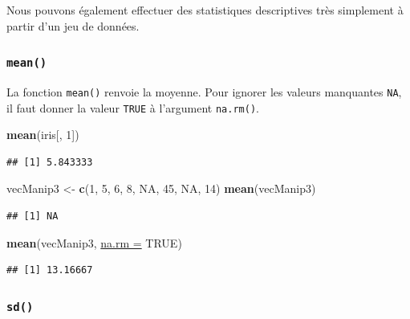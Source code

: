 \documentclass[twoside,symmetric]{book}
\newenvironment{Shaded}{}{}
\newcommand{\DataTypeTok}[1]{\underline{#1}}
\newcommand{\DecValTok}[1]{#1}
\newcommand{\KeywordTok}[1]{\textbf{#1}}
\newcommand{\NormalTok}[1]{#1}
\newcommand{\OtherTok}[1]{#1}
\newcommand{\StringTok}[1]{#1}
\begin{document}
Nous pouvons également effectuer des statistiques descriptives très simplement à partir d'un jeu de données.

\hypertarget{l015mean}{%
\subsubsection{\texorpdfstring{\texttt{mean()}}{mean()}}\label{l015mean}}

La fonction \texttt{mean()} renvoie la moyenne. Pour ignorer les valeurs manquantes \texttt{NA}, il faut donner la valeur \texttt{TRUE} à l'argument \texttt{na.rm()}.

\begin{Shaded}
\begin{Highlighting}[]
\KeywordTok{mean}\NormalTok{(iris[, }\DecValTok{1}\NormalTok{])}
\end{Highlighting}
\end{Shaded}

\begin{verbatim}
## [1] 5.843333
\end{verbatim}

\begin{Shaded}
\begin{Highlighting}[]
\NormalTok{vecManip3 <-}\StringTok{ }\KeywordTok{c}\NormalTok{(}\DecValTok{1}\NormalTok{, }\DecValTok{5}\NormalTok{, }\DecValTok{6}\NormalTok{, }\DecValTok{8}\NormalTok{, }\OtherTok{NA}\NormalTok{, }\DecValTok{45}\NormalTok{, }\OtherTok{NA}\NormalTok{, }\DecValTok{14}\NormalTok{)}
\KeywordTok{mean}\NormalTok{(vecManip3)}
\end{Highlighting}
\end{Shaded}

\begin{verbatim}
## [1] NA
\end{verbatim}

\begin{Shaded}
\begin{Highlighting}[]
\KeywordTok{mean}\NormalTok{(vecManip3, }\DataTypeTok{na.rm =} \OtherTok{TRUE}\NormalTok{)}
\end{Highlighting}
\end{Shaded}

\begin{verbatim}
## [1] 13.16667
\end{verbatim}

\hypertarget{l015sd}{%
\subsubsection{\texorpdfstring{\texttt{sd()}}{sd()}}\label{l015sd}}
\end{document}

